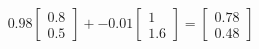 \documentclass[preview]{standalone}
\begin{document}
\begin{align*}
0.98 \begin{bmatrix} 0.8 \\ 0.5 \end{bmatrix} + -0.01 \begin{bmatrix} 1 \\ 1.6 \end{bmatrix} = \begin{bmatrix} 0.78 \\ 0.48 \end{bmatrix}
\end{align*}
\end{document}
